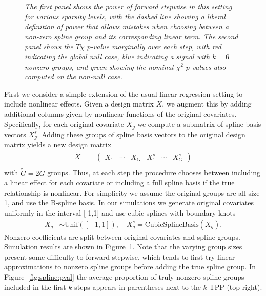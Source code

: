 \documentclass{imsart}
\begin{document}
\begin{figure}[!htp]
\begin{center}
\caption{\small \it The first panel shows the power of forward stepwise
in this setting for various sparsity levels, with the dashed line
showing a liberal definition of power that allows mistakes when
choosing between a non-zero spline group and its corresponding linear
term.
The second panel shows the $T\chi$ $p$-value marginally
over each step, with red indicating the global null case, blue
indicating a signal with $k=6$ nonzero groups, and green showing
the nominal $\chi^2$ $p$-values also computed on the non-null case.}
\label{fig:spline}
\end{center}
\end{figure}

First we consider a simple extension of the usual linear regression setting to include nonlinear effects. Given a design matrix $X$, we augment this by adding additional columns given by nonlinear functions of the original covariates. Specifically, for each original covariate $X_g$ we compute a submatrix of spline basis vectors $X_g^s$. Adding these groups of spline basis vectors to the original design matrix yields a new design matrix
\begin{equation}
\label{eq:splinemat}
  \begin{aligned}
    \tilde X &=  \begin{pmatrix} X_1 & \cdots & X_G & X^s_1 & \cdots & X^s_G  \end{pmatrix}\\
  \end{aligned}
\end{equation}
with $\tilde G = 2G$ groups. Thus, at each step the procedure chooses between including a linear effect for each covariate or including a full spline basis if the true relationship is nonlinear.
For simplicity we assume the original groups are all size 1, and use the B-spline basis. In our simulations we generate original covariates uniformly in the interval [-1,1] and use cubic splines with boundary knots
\begin{equation}
  \begin{aligned}
    X_g &\sim \text{Unif}([-1,1]), \quad
    X_g^s = \text{CubicSplineBasis}(X_g).
  \end{aligned}
\end{equation}
Nonzero coefficients are split between original covariates and spline groups. Simulation results are shown in Figure~\ref{fig:spline}. Note that the varying group sizes present some difficulty to forward stepwise, which tends to first try linear approximations to nonzero spline groups before adding the true spline group. In Figure~\ref{fig:spline:pval} the average proportion of truly nonzero spline groups included in the first $k$ steps appears in parentheses next to the $k$-TPP (top right).
\end{document}
